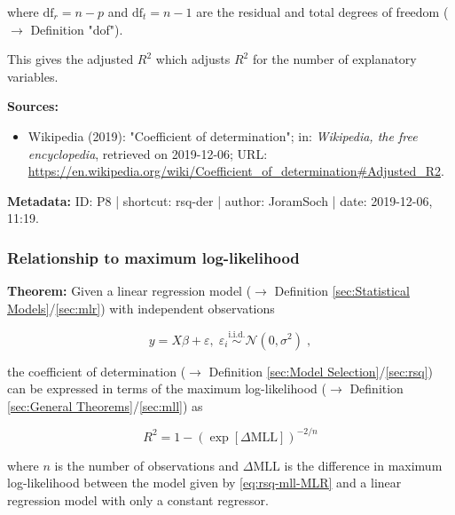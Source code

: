 \documentclass[a4paper,12pt,twoside]{book}
\begin{document}
where $\mathrm{df}_r = n-p$ and $\mathrm{df}_t = n-1$ are the residual and total degrees of freedom ($\rightarrow$ Definition "dof").

\vspace{1em}
This gives the adjusted $R^2$ which adjusts $R^2$ for the number of explanatory variables.


\vspace{1em}
\textbf{Sources:}
\begin{itemize}
\item Wikipedia (2019): "Coefficient of determination"; in: \textit{Wikipedia, the free encyclopedia}, retrieved on 2019-12-06; URL: \url{https://en.wikipedia.org/wiki/Coefficient_of_determination#Adjusted_R2}.
\end{itemize}


\vspace{1em}
\textbf{Metadata:} ID: P8 | shortcut: rsq-der | author: JoramSoch | date: 2019-12-06, 11:19.
\vspace{1em}



\subsubsection[\textbf{Relationship to maximum log-likelihood}]{Relationship to maximum log-likelihood} \label{sec:rsq-mll}
\setcounter{equation}{0}

\textbf{Theorem:} Given a linear regression model ($\rightarrow$ Definition \ref{sec:Statistical Models}/\ref{sec:mlr}) with independent observations

\begin{equation} \label{eq:rsq-mll-MLR}
y = X\beta + \varepsilon, \; \varepsilon_i \overset{\mathrm{i.i.d.}}{\sim} \mathcal{N}(0, \sigma^2) \; ,
\end{equation}

the coefficient of determination ($\rightarrow$ Definition \ref{sec:Model Selection}/\ref{sec:rsq}) can be expressed in terms of the maximum log-likelihood ($\rightarrow$ Definition \ref{sec:General Theorems}/\ref{sec:mll}) as

\begin{equation} \label{eq:rsq-mll-R2-MLL}
R^2 = 1 - \left( \exp[\Delta\mathrm{MLL}] \right)^{-2/n}
\end{equation}

where $n$ is the number of observations and $\Delta\mathrm{MLL}$ is the difference in maximum log-likelihood between the model given by \eqref{eq:rsq-mll-MLR} and a linear regression model with only a constant regressor.
\end{document}
